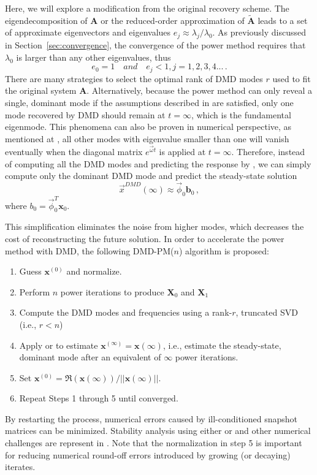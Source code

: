 Here, we will explore a modification from the original recovery scheme.
The eigendecomposition of $\mathbf{A}$ or the reduced-order approximation of $\mathbf{\tilde{A}}$ leads to a set of approximate eigenvectors and eigenvalues $e_j \approx \lambda_j / \lambda_0$.
As previously discussed in Section~\ref{sec:convergence}, the convergence of the power method requires that $\lambda_0$ is larger than any other eigenvalues, thus 
\begin{equation}
\label{eq:ej}
e_0 = 1 \quad and  \quad e_j < 1,j = 1,2,3,4... \, .
\end{equation}
There are many strategies to select the optimal rank of DMD modes $r$ used to fit the original system $\mathbf{A}$. 
Alternatively, because the power method can only reveal a single, dominant mode if the assumptions described in  are satisfied, only one mode recovered by DMD should remain at $t=\infty$, which is the fundamental eigenmode.
This phenomena can also be proven in numerical perspective, as mentioned at , all other modes with eigenvalue smaller than one will vanish eventually when the diagonal matrix $e^{\vec{\omega}t}$ is applied at $t=\infty$.
Therefore, instead of computing all the DMD modes and predicting the response by , we can simply compute only the dominant DMD mode and predict the steady-state solution 
\begin{equation}
\label{eq:f_mode}
\vec{x}^{DMD}(\infty) \approx \vec{\phi}_0 \mathbf{b}_0 \, ,
\end{equation}
where $b_0= \vec{\phi}_0^{T} \mathbf{x}_{0}$.

This simplification eliminates the noise from higher modes, which decreases the cost of reconstructing the future solution.
In order to accelerate the power method with DMD, the following DMD-PM($n$) algorithm is proposed:
\begin{enumerate}
 \item Guess $\mathbf{x}^{(0)}$ and normalize.
 \item Perform $n$ power iterations to produce $\mathbf{X}_0$ and $\mathbf{X}_1$
 \item Compute the DMD modes and frequencies using a rank-$r$, truncated  SVD (i.e., $r < n$)
 \item Apply  or  to estimate $\mathbf{x}^{(\infty)}=\mathbf{x}(\infty)$, i.e., estimate the steady-state, dominant mode after an equivalent of $\infty$ power iterations.
 \item Set $\mathbf{x}^{(0)} = \Re(\mathbf{x}(\infty)) / ||\mathbf{x}(\infty)||$.  
 \item Repeat Steps 1 through 5 until converged.
\end{enumerate}
By restarting the process, numerical errors caused by ill-conditioned snapshot matrices can be minimized.
Stability analysis using either  or  and other numerical challenges are represent in .
Note that the normalization in step 5 is important for reducing numerical round-off errors introduced by growing (or decaying) iterates.

